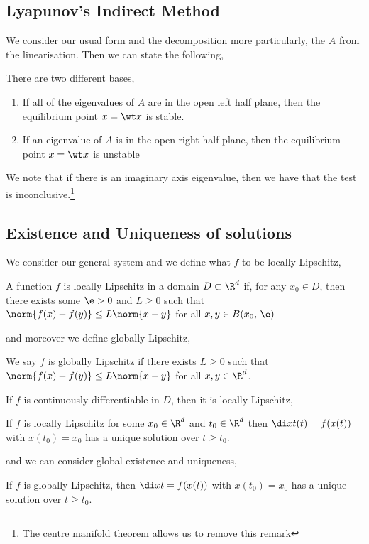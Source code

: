 \subsection{Lyapunov's Indirect Method}
We consider our usual form and the decomposition more particularly, the $A$ from the linearisation. Then we can state the following,
\begin{nthm}
  There are two different bases,
  \begin{enumerate}
    \item If all of the eigenvalues of $A$ are in the open left half plane, then the equilibrium point $x = \wt x$ is stable.
    \item If an eigenvalue of $A$ is in the open right half plane, then the equilibrium point $x = \wt x$ is unstable
  \end{enumerate}
\end{nthm}

We note that if there is an imaginary axis eigenvalue, then we have that the test is inconclusive.\footnote{The centre manifold theorem allows us to remove this remark}

\subsection{Existence and Uniqueness of solutions}
We consider our general system and we define what $f$ to be locally Lipschitz,
\begin{ndefi}
  A function $f$ is locally Lipschitz in a domain $D \subset \R^d$ if, for any $x_0 \in D$, then there exists some $\e > 0$ and $L \ge 0$ such that $\norm{f(x) - f(y)} \le L\norm{x - y}$ for all $x, y \in B(x_0,\,\e)$
\end{ndefi}
and moreover we define globally Lipschitz,
\begin{ndefi}
  We say $f$ is globally Lipschitz if there exists $L \ge 0$ such that $\norm{f(x) - f(y)} \le L\norm{x - y}$ for all $x, y \in \R^d$.
\end{ndefi}

If $f$ is continuously differentiable in $D$, then it is locally Lipschitz,
\begin{nthm}
  If $f$ is locally Lipschitz for some $x_0 \in \R^d$ and $t_0 \in \R^d$ then $\di x t(t) = f(x(t))$ with $x(t_0) = x_0$ has a unique solution over $t \ge t_0$.
\end{nthm}

and we can consider global existence and uniqueness,
\begin{ndefi}
  If $f$ is globally Lipschitz, then $\di x t = f(x(t))$ with $x(t_0) = x_0$ has a unique solution over $t \ge t_0$.
\end{ndefi}

